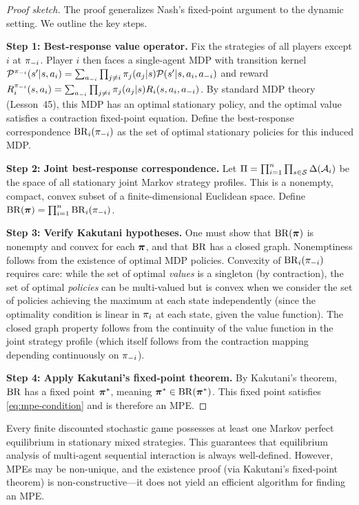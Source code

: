 \documentclass[11pt,a4paper]{article}
\begin{document}
\begin{proof}[Proof sketch]
The proof generalizes Nash's fixed-point argument to the dynamic
setting.  We outline the key steps.

\textbf{Step 1: Best-response value operator.}
Fix the strategies of all players except $i$ at $\pi_{-i}$.
Player $i$ then faces a single-agent MDP with transition kernel
$\mathcal{P}^{\pi_{-i}}(s'|s, a_i) = \sum_{a_{-i}}
\prod_{j \neq i} \pi_j(a_j|s) \mathcal{P}(s'|s, a_i, a_{-i})$
and reward $R_i^{\pi_{-i}}(s,a_i) = \sum_{a_{-i}}
\prod_{j \neq i} \pi_j(a_j|s) R_i(s,a_i,a_{-i})$.
By standard MDP theory (Lesson~45), this MDP has an optimal
stationary policy, and the optimal value satisfies a contraction
fixed-point equation.  Define the best-response correspondence
$\mathrm{BR}_i(\pi_{-i})$ as the set of optimal stationary policies for
this induced MDP.

\textbf{Step 2: Joint best-response correspondence.}
Let $\Pi = \prod_{i=1}^n \prod_{s \in \mathcal{S}}
\Delta(\mathcal{A}_i)$ be the space of all stationary joint Markov
strategy profiles.  This is a nonempty, compact, convex subset of a
finite-dimensional Euclidean space.  Define
$\mathrm{BR}(\boldsymbol{\pi}) = \prod_{i=1}^n \mathrm{BR}_i(\pi_{-i})$.

\textbf{Step 3: Verify Kakutani hypotheses.}
One must show that $\mathrm{BR}(\boldsymbol{\pi})$ is nonempty and convex for each
$\boldsymbol{\pi}$, and that $\mathrm{BR}$ has a closed graph.  Nonemptiness follows
from the existence of optimal MDP policies.  Convexity of
$\mathrm{BR}_i(\pi_{-i})$ requires care: while the set of optimal
\emph{values} is a singleton (by contraction), the set of optimal
\emph{policies} can be multi-valued but is convex when we consider
the set of policies achieving the maximum at each state independently
(since the optimality condition is linear in $\pi_i$ at each
state, given the value function).  The closed graph property follows
from the continuity of the value function in the joint strategy
profile (which itself follows from the contraction mapping depending
continuously on $\pi_{-i}$).

\textbf{Step 4: Apply Kakutani's fixed-point theorem.}
By Kakutani's theorem, $\mathrm{BR}$ has a fixed point $\boldsymbol{\pi}^*$, meaning
$\boldsymbol{\pi}^* \in \mathrm{BR}(\boldsymbol{\pi}^*)$.  This fixed point satisfies
\eqref{eq:mpe-condition} and is therefore an MPE.
\end{proof}

\begin{keyresult}[title={Markov Perfect Equilibrium Existence}]
Every finite discounted stochastic game possesses at least one
Markov perfect equilibrium in stationary mixed strategies.  This
guarantees that equilibrium analysis of multi-agent sequential
interaction is always well-defined.  However, MPEs may be
non-unique, and the existence proof (via Kakutani's fixed-point
theorem) is non-constructive---it does not yield an efficient
algorithm for finding an MPE.
\end{keyresult}
\end{document}
